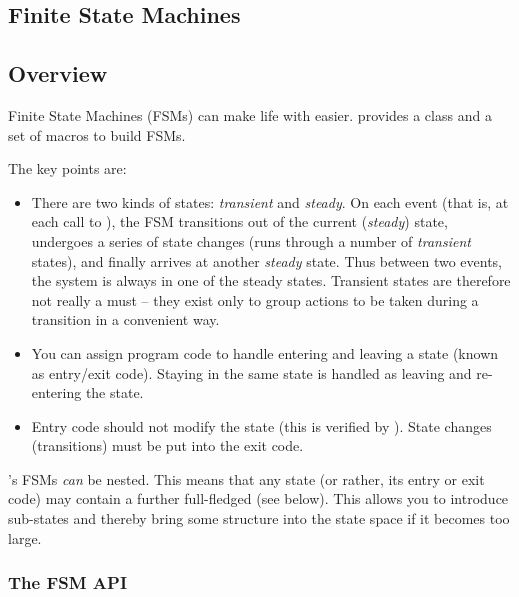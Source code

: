 \begin{ned}
\section{Finite State Machines}
\label{sec:simple-modules:fsm}

\subsection{Overview}
\label{sec:simple-modules:fsm-overview}

Finite State Machines (FSMs)
can make life with  easier. {\opp} provides a
class and a set of macros to build FSMs.

The key points are:
\begin{itemize}
\item There are two kinds of states:
    \textit{transient} and
    \textit{steady}. On each event (that is, at
    each call to ), the FSM transitions out of
    the current (\textit{steady}) state, undergoes a series of state
    changes (runs through a number of \textit{transient} states), and
    finally arrives at another \textit{steady} state. Thus between two
    events, the system is always in one of the steady states.
    Transient states are therefore not really a must -- they exist
    only to group actions to be taken during a transition in a
    convenient way.
\item You can assign program code to handle entering and leaving a state
    (known as entry/exit code).
    Staying in the same state is handled as leaving and re-entering
    the state.
\item Entry code should not modify the state (this is verified by
    {\opp}).  State changes (transitions) must be put into the exit
    code.
\end{itemize}

{\opp}'s FSMs \textit{can} be nested. This means
that any state (or rather, its entry or exit code) may contain a
further full-fledged  (see below). This allows you
to introduce sub-states and thereby bring some structure into the
state space if it becomes too large.


\subsubsection{The FSM API}
\label{sec:simple-modules:fsm-api}


\end{ned}
